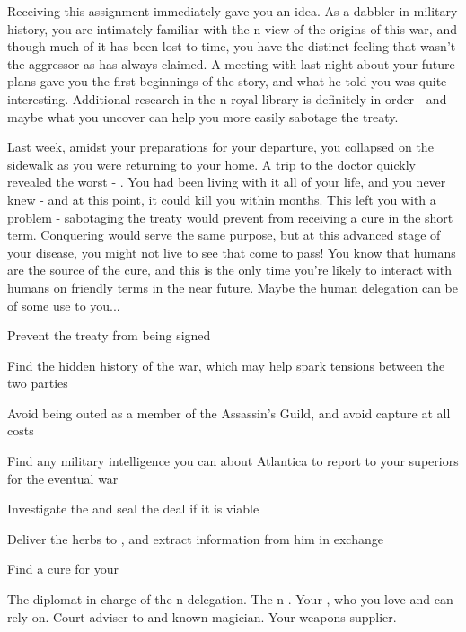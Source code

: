 \documentclass[char]{NeptuneBall}
\begin{document}
Receiving this assignment immediately gave you an idea. As a dabbler in military history, you are intimately familiar with the \pPacifica{}n view of the origins of this war, and though much of it has been lost to time, you have the distinct feeling that \pPacifica{} wasn't the aggressor as \pAtlantis{} has always claimed. A meeting with \CManta{} last night about your future plans gave you the first beginnings of the story, and what he told you was quite interesting. Additional research in the \pAtlantis{}n royal library is definitely in order - and maybe what you uncover can help you more easily sabotage the treaty. 

Last week, amidst your preparations for your departure, you collapsed on the sidewalk as you were returning to your home. A trip to the doctor quickly revealed the worst - \pPolio{}. You had been living with it all of your life, and you never knew - and at this point, it could kill you within months. This left you with a problem - sabotaging the treaty would prevent \pPacifica{} from receiving a cure in the short term. Conquering \pAtlantis{} would serve the same purpose, but at this advanced stage of your disease, you might not live to see that come to pass! You know that humans are the source of the cure, and this is the only time you're likely to interact with humans on friendly terms in the near future. Maybe the human delegation can be of some use to you...

\begin{itemz}[Goals]
	\item Prevent the treaty from being signed
	\item Find the hidden history of the war, which may help spark tensions between the two parties
	\item Avoid being outed as a member of the Assassin's Guild, and avoid capture at all costs
  \item Find any military intelligence you can about Atlantica to report to your superiors for the eventual war
	\item Investigate the \iPrototype{} and seal the deal if it is viable
	\item Deliver the herbs to \cManta{}, and extract information from him in exchange
	\item Find a cure for your \pPolio{}

\end{itemz}

\begin{contacts}
	\contact{\cDiplomat{}} The diplomat in charge of the \pPacifica{}n delegation.
	\contact{\cPrince{}} The \pPacifica{}n \cPrince{\Prince}.
  \contact{\cBodyguard{}} Your \cSpy{\sibling}, who you love and can rely on.
	\contact{\cManta{}} Court adviser to \cKing{\King} \cKing{} and known magician.
	\contact{\cGeneral{}} Your weapons supplier.
\end{contacts}
\end{document}
